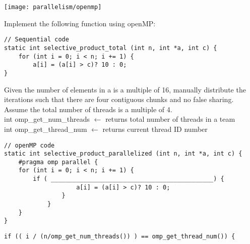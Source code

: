 \begin{blocksection}

\texttt{[image: parallelism/openmp]}

\question
Implement the following function using openMP:
\begin{verbatim}
// Sequential code
static int selective_product_total (int n, int *a, int c) {
    for (int i = 0; i < n; i += 1) {
        a[i] = (a[i] > c)? 10 : 0;
}
\end{verbatim}

Given the number of elements in a is a multiple of 16, manually distribute the iterations such that there are four contiguous chunks and no false sharing. 
Assume the total number of threads is a multiple of 4. \\
int omp\_get\_num\_threads $\leftarrow$ returns total number of threads in a team \\
int omp\_get\_thread\_num $\leftarrow$ returns current thread ID number

\begin{verbatim}
// openMP code
static int selective_product_parallelized (int n, int *a, int c) {
    #pragma omp parallel {
    for (int i = 0; i < n; i += 1) {
        if ( _____________________________________________) {
                    a[i] = (a[i] > c)? 10 : 0;
                }
            }
    }
}
\end{verbatim}

\begin{solution}[0.5in]
\begin{verbatim}
if (( i / (n/omp_get_num_threads()) ) == omp_get_thread_num()) {
\end{verbatim}
\end{solution}
    
\end{blocksection}